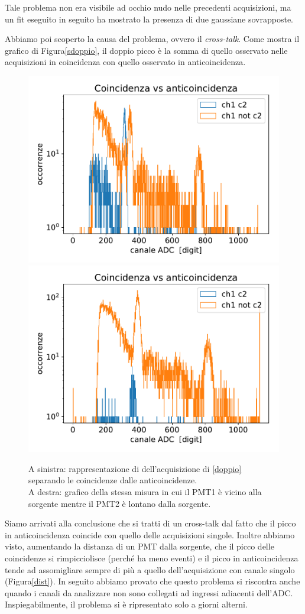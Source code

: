 Tale problema non era visibile ad occhio nudo nelle precedenti acquisizioni, ma un fit eseguito in seguito ha mostrato la presenza di due gaussiane sovrapposte.


Abbiamo poi scoperto la causa del problema, ovvero il \emph{cross-talk}.
Come mostra il grafico di Figura\autoref{sdoppio}, il doppio picco è la somma di quello osservato nelle acquisizioni in coincidenza con quello osservato in anticoincidenza. 

\begin{figure}[h]
\centering
\subfloat
{
\includegraphics[width=18 em]{immagini/sdoppio}
\label{sdoppio}
}
\subfloat
{
\includegraphics[width=18 em]{immagini/dist}
\label{dist}
}

\caption{A sinistra: rappresentazione di dell'acquisizione di \autoref{doppio} separando le coincidenze dalle anticoincidenze. \\
A destra: grafico della stessa misura in cui il PMT1 è vicino alla sorgente mentre il PMT2 è lontano dalla sorgente.}

\end{figure}

Siamo arrivati alla conclusione che si tratti di un cross-talk dal fatto che il picco in anticoincidenza coincide con quello delle acquisizioni singole. Inoltre abbiamo visto, aumentando la distanza di un PMT dalla sorgente, che il picco delle coincidenze si rimpicciolisce (perché ha meno eventi) e il picco in anticoincidenza tende ad assomigliare sempre di più a quello dell'acquisizione con canale singolo (Figura\autoref{dist}).
In seguito abbiamo provato che questo problema si riscontra anche quando i canali da analizzare non sono collegati ad ingressi adiacenti dell'ADC. Inspiegabilmente, il problema si è ripresentato solo a giorni alterni. 
